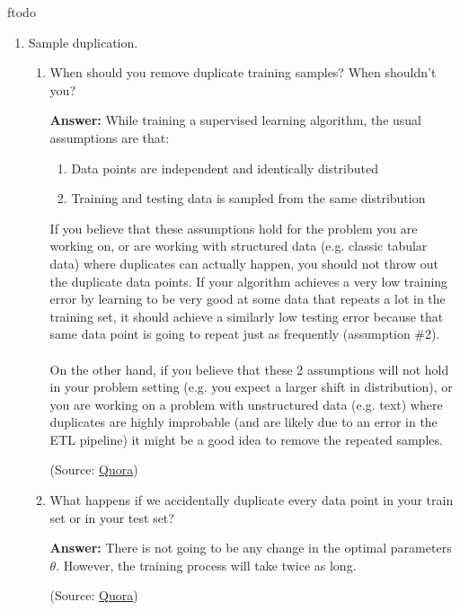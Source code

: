 ƒtodo\documentclass{article}
\newenvironment{QandA}{\begin{enumerate}[label=\arabic*.]}{\end{enumerate}}
\newenvironment{InnerQandA}{\begin{enumerate}[label=\roman*.]}{\end{enumerate}}
\newenvironment{answer}{\par\normalfont \textbf{Answer:}}{}
\begin{document}
\begin{QandA}
    \item Sample duplication.
    \begin{InnerQandA}
        \item When should you remove duplicate training samples? When shouldn’t you?
        \begin{answer}
            While training a supervised learning algorithm, the usual assumptions are that:
            \begin{enumerate}[label=\arabic*.]
                \item Data points are independent and identically distributed
                \item Training and testing data is sampled from the same distribution
            \end{enumerate}

            If you believe that these assumptions hold for the problem you are working on, or are working with structured data (e.g. classic tabular data) where duplicates can actually happen, you should not throw out the duplicate data points. If your algorithm achieves a very low training error by learning to be very good at some data that repeats a lot in the training set, it should achieve a similarly low testing error because that same data point is going to repeat just as frequently (assumption \#2). \\\\
            On the other hand, if you believe that these 2 assumptions will not hold in your problem setting (e.g. you expect a larger shift in distribution), or you are working on a problem with unstructured data (e.g. text) where duplicates are highly improbable (and are likely due to an error in the ETL pipeline) it might be a good idea to remove the repeated samples.

            (Source: \href{https://www.quora.com/Should-we-remove-duplicates-from-a-data-set-while-training-a-Machine-Learning-algorithm-shallow-and-or-deep-methods}{Quora})
        \end{answer}

        \item What happens if we accidentally duplicate every data point in your train set or in your test set?
        \begin{answer}
            There is not going to be any change in the optimal parameters $\theta$. However, the training process will take twice as long.

            (Source: \href{https://www.quora.com/What-happens-if-I-double-the-same-data-that-was-duplicated-for-classification-in-machine-learning-What-kind-of-impact-does-it-have}{Quora})
        \end{answer}
    \end{InnerQandA}


\end{QandA}
\end{document}
